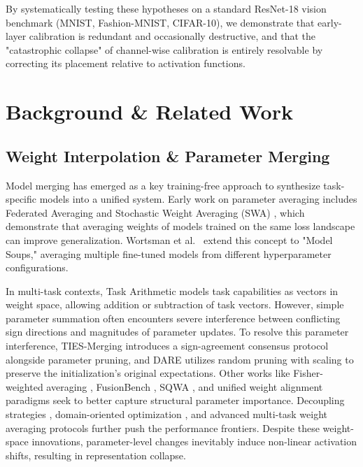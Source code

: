 \documentclass{article}
\theoremstyle{plain}
\theoremstyle{definition}
\theoremstyle{remark}
\begin{document}
By systematically testing these hypotheses on a standard ResNet-18 vision benchmark (MNIST, Fashion-MNIST, CIFAR-10), we demonstrate that early-layer calibration is redundant and occasionally destructive, and that the "catastrophic collapse" of channel-wise calibration is entirely resolvable by correcting its placement relative to activation functions.

\section{Background \& Related Work}
\label{sec:background}

\subsection{Weight Interpolation \& Parameter Merging}
Model merging has emerged as a key training-free approach to synthesize task-specific models into a unified system. Early work on parameter averaging includes Federated Averaging \cite{mcmahan2017federated} and Stochastic Weight Averaging (SWA) \cite{izmailov2018swa}, which demonstrate that averaging weights of models trained on the same loss landscape can improve generalization. Wortsman et al.\ \cite{wortsman2022model} extend this concept to "Model Soups," averaging multiple fine-tuned models from different hyperparameter configurations. 

In multi-task contexts, Task Arithmetic \cite{ilharco2022editing} models task capabilities as vectors in weight space, allowing addition or subtraction of task vectors. However, simple parameter summation often encounters severe interference between conflicting sign directions and magnitudes of parameter updates. To resolve this parameter interference, TIES-Merging \cite{yadav2023ties} introduces a sign-agreement consensus protocol alongside parameter pruning, and DARE \cite{yu2024dare} utilizes random pruning with scaling to preserve the initialization's original expectations. Other works like Fisher-weighted averaging \cite{matena2022merging}, FusionBench \cite{tang2024fusionbench}, SQWA \cite{shin2020sqwa}, and unified weight alignment paradigms \cite{wang2024unified} seek to better capture structural parameter importance. Decoupling strategies \cite{wald2024decoupling}, domain-oriented optimization \cite{xu2023domainoriented}, and advanced multi-task weight averaging protocols \cite{athiwaratkun2018improving, kaddour2022fair, guo2022stochastic} further push the performance frontiers. Despite these weight-space innovations, parameter-level changes inevitably induce non-linear activation shifts, resulting in representation collapse.
\end{document}
